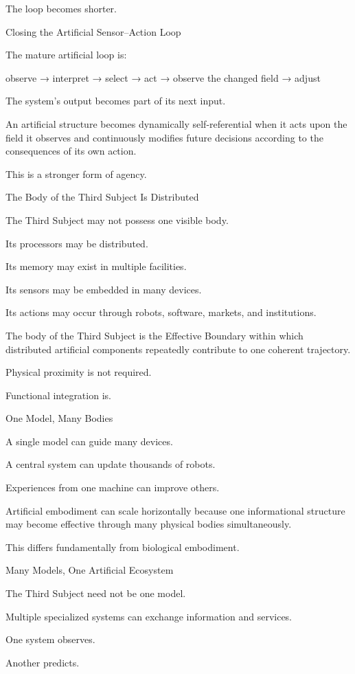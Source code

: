 The loop becomes shorter.

Closing the Artificial Sensor–Action Loop

The mature artificial loop is:

observe
→ interpret
→ select
→ act
→ observe the changed field
→ adjust

The system’s output becomes part of its next input.

An artificial structure becomes dynamically self-referential when it acts upon the field it observes and continuously modifies future decisions according to the consequences of its own action.

This is a stronger form of agency.

The Body of the Third Subject Is Distributed

The Third Subject may not possess one visible body.

Its processors may be distributed.

Its memory may exist in multiple facilities.

Its sensors may be embedded in many devices.

Its actions may occur through robots, software, markets, and institutions.

The body of the Third Subject is the Effective Boundary within which distributed artificial components repeatedly contribute to one coherent trajectory.

Physical proximity is not required.

Functional integration is.

One Model, Many Bodies

A single model can guide many devices.

A central system can update thousands of robots.

Experiences from one machine can improve others.

Artificial embodiment can scale horizontally because one informational structure may become effective through many physical bodies simultaneously.

This differs fundamentally from biological embodiment.

Many Models, One Artificial Ecosystem

The Third Subject need not be one model.

Multiple specialized systems can exchange information and services.

One system observes.

Another predicts.

